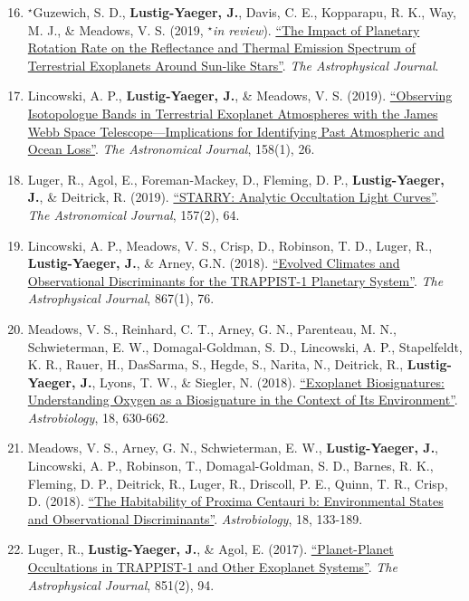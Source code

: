 \documentclass[margin,10pt]{res}
\newenvironment{benumerate}[1]{
    \let\oldItem\item
    \def\item{\addtocounter{enumi}{-2}\oldItem}
    \begin{enumerate}
    \setcounter{enumi}{#1}
    \addtocounter{enumi}{1}
}{
    \end{enumerate}
}
\begin{document}
\begin{resume}
\begin{benumerate}{15}
                    \item $^{\star}$Guzewich, S. D., \textbf{Lustig-Yaeger, J.}, Davis, C. E., Kopparapu, R. K., Way, M. J., \& Meadows, V. S.  (2019, $^{\star}$\textit{in review}). \href{}{``The Impact of Planetary Rotation Rate on the Reflectance and Thermal Emission Spectrum of Terrestrial Exoplanets Around Sun-like Stars''}. \textit{The Astrophysical Journal}.
                    \item Lincowski, A. P., \textbf{Lustig-Yaeger, J.}, \& Meadows, V. S.  (2019). \href{https://doi.org/10.3847/1538-3881/ab2385}{``Observing Isotopologue Bands in Terrestrial Exoplanet Atmospheres with the James Webb Space Telescope---Implications for Identifying Past Atmospheric and Ocean Loss''}. \textit{The Astronomical Journal}, 158(1), 26.
                    \item Luger, R., Agol, E., Foreman-Mackey, D., Fleming, D. P., \textbf{Lustig-Yaeger, J.}, \& Deitrick, R. (2019).  \href{http://adsabs.harvard.edu/cgi-bin/bib_query?arXiv:1810.06559}{``STARRY: Analytic Occultation Light Curves''}. \textit{The Astronomical Journal}, 157(2), 64.
                    \item Lincowski, A. P., Meadows, V. S., Crisp, D., Robinson, T. D., Luger, R., \textbf{Lustig-Yaeger, J.}, \& Arney, G.N. (2018). \href{http://adsabs.harvard.edu/cgi-bin/bib_query?arXiv:1809.07498}{``Evolved Climates and Observational Discriminants for the TRAPPIST-1 Planetary System''}. \textit{The Astrophysical Journal}, 867(1), 76.
                    \item Meadows, V. S.,  Reinhard, C. T., Arney, G. N., Parenteau, M. N., Schwieterman, E. W., Domagal-Goldman, S. D., Lincowski, A. P., Stapelfeldt, K. R., Rauer, H., DasSarma, S., Hegde, S., Narita, N., Deitrick, R., \textbf{Lustig-Yaeger, J.}, Lyons, T. W., \& Siegler, N. (2018).  \href{http://adsabs.harvard.edu/abs/2018AsBio..18..630M}{``Exoplanet Biosignatures:  Understanding Oxygen as a Biosignature in the Context of Its Environment''}. \textit{Astrobiology}, 18, 630-662.
                    \item Meadows, V. S., Arney, G. N., Schwieterman, E. W., \textbf{Lustig-Yaeger, J.}, Lincowski, A. P., Robinson, T.,  Domagal-Goldman, S. D., Barnes, R. K., Fleming, D. P., Deitrick, R., Luger, R., Driscoll, P. E., Quinn, T. R., Crisp, D. (2018). \href{http://adsabs.harvard.edu/abs/2018AsBio..18..133M}{``The Habitability of Proxima Centauri b: Environmental States and Observational Discriminants''}. \textit{Astrobiology}, 18, 133-189.
                    \item Luger, R., \textbf{Lustig-Yaeger, J.}, \& Agol, E. (2017).  \href{http://adsabs.harvard.edu/abs/2017ApJ...851...94L}{``Planet-Planet Occultations in TRAPPIST-1 and Other Exoplanet Systems''}. \textit{The Astrophysical Journal}, 851(2), 94.

\end{benumerate}
\end{resume}
\end{document}
